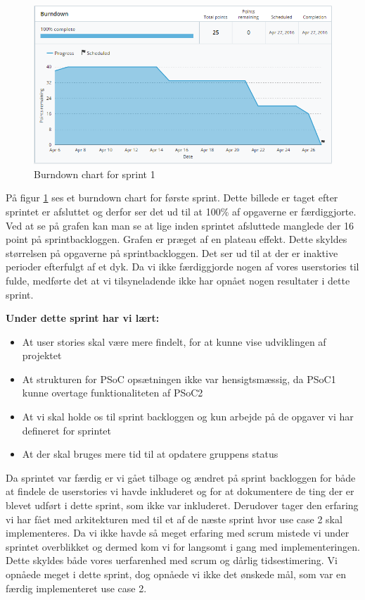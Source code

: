 \documentclass[a4paper,oneside,article]{memoir}
\begin{document}
	\begin{figure}[H]
		\centering
		\includegraphics[width=\textwidth]{Projektgennemfoerelse/images/burndown1}
		\caption{Burndown chart for sprint 1}
		\label{ref:Burndown1}
	\end{figure}
	
	På figur \ref{ref:Burndown1} ses et burndown chart for første sprint. Dette billede er taget efter sprintet er afsluttet og derfor ser det ud til at 100\% af opgaverne er færdiggjorte. Ved at se på grafen kan man se at lige  inden sprintet afsluttede manglede der 16 point på sprintbackloggen. Grafen er præget af en plateau effekt. Dette skyldes størrelsen på opgaverne på sprintbackloggen. Det ser ud til at der er inaktive perioder efterfulgt af et dyk. Da vi ikke færdiggjorde nogen af vores userstories til fulde, medførte det at vi tilsyneladende ikke har opnået nogen resultater i dette sprint.  \newline
	
	\textbf{Under dette sprint har vi lært:}
	\begin{itemize}
		\item At user stories skal være mere findelt, for at kunne vise udviklingen af projektet
		\item At strukturen for PSoC opsætningen ikke var hensigtsmæssig, da PSoC1 kunne overtage funktionaliteten af PSoC2
		\item At vi skal holde os til sprint backloggen og kun arbejde på de opgaver vi har defineret for sprintet
		\item At der skal bruges mere tid til at opdatere gruppens status
	\end{itemize}
	
	Da sprintet var færdig er vi gået tilbage og ændret på sprint backloggen for både at findele de userstories vi havde inkluderet og for at dokumentere de ting der er blevet udført i dette sprint, som ikke var inkluderet. Derudover tager den erfaring vi har fået med arkitekturen med til et af de næste sprint hvor use case 2 skal implementeres. Da vi ikke havde så meget erfaring med scrum mistede vi under sprintet overblikket og dermed kom vi for langsomt i gang med implementeringen. Dette skyldes både vores uerfarenhed med scrum og dårlig tidsestimering. Vi opnåede meget i dette sprint, dog opnåede vi ikke det ønskede mål, som var en færdig implementeret use case 2. 
	
\end{document}
